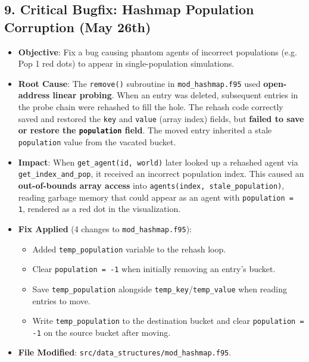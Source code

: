 \subsection{9. Critical Bugfix: Hashmap Population Corruption (May 26th)}
\begin{itemize}
\item \textbf{Objective}: Fix a bug causing phantom agents of incorrect populations (e.g. Pop 1 red dots) to appear in single-population simulations.
\item \textbf{Root Cause}: The \texttt{remove()} subroutine in \texttt{mod\_hashmap.f95} used \textbf{open-address linear probing}. When an entry was deleted, subsequent entries in the probe chain were rehashed to fill the hole. The rehash code correctly saved and restored the \texttt{key} and \texttt{value} (array index) fields, but \textbf{failed to save or restore the \texttt{population} field}. The moved entry inherited a stale \texttt{population} value from the vacated bucket.
\item \textbf{Impact}: When \texttt{get\_agent(id, world)} later looked up a rehashed agent via \texttt{get\_index\_and\_pop}, it received an incorrect population index. This caused an \textbf{out-of-bounds array access} into \texttt{agents(index, stale\_population)}, reading garbage memory that could appear as an agent with \texttt{population = 1}, rendered as a red dot in the visualization.
\item \textbf{Fix Applied} (4 changes to \texttt{mod\_hashmap.f95}):
\begin{itemize}
\item Added \texttt{temp\_population} variable to the rehash loop.
\item Clear \texttt{population = -1} when initially removing an entry's bucket.
\item Save \texttt{temp\_population} alongside \texttt{temp\_key}/\texttt{temp\_value} when reading entries to move.
\item Write \texttt{temp\_population} to the destination bucket and clear \texttt{population = -1} on the source bucket after moving.
\end{itemize}
\item \textbf{File Modified}: \texttt{src/data\_structures/mod\_hashmap.f95}.
\end{itemize}


